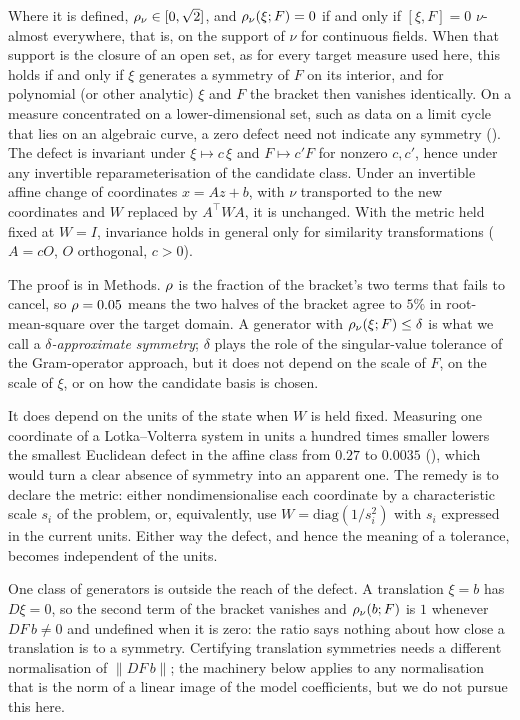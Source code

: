 \begin{lemma}[Properties]
\label{lem:props}
Where it is defined, $\rho_\nu \in [0,\sqrt 2]$, and $\rho_\nu(\xi;F)=0$
if and only if $[\xi,F]=0$ $\nu$-almost everywhere, that is, on the support of
$\nu$ for continuous fields. When that support is the closure of an open set,
as for every target measure used here, this holds if and only if $\xi$
generates a symmetry of $F$ on its interior, and for polynomial (or other
analytic) $\xi$ and $F$ the bracket then vanishes identically. On a measure
concentrated on a lower-dimensional set, such as data on a limit cycle that
lies on an algebraic curve, a zero defect need not indicate any symmetry
(). The defect is invariant under $\xi \mapsto c\,\xi$ and $F \mapsto c'F$ for nonzero $c,c'$,
hence under any invertible reparameterisation of the candidate class. Under an
invertible affine change of coordinates $x = Az + b$, with $\nu$ transported to
the new coordinates and $W$ replaced by $A^{\!\top}WA$, it is unchanged. With
the metric held fixed at $W = I$, invariance holds in general only for
similarity transformations ($A = cO$, $O$ orthogonal, $c > 0$).
\end{lemma}

The proof is in Methods. $\rho$ is the fraction of the bracket's two terms
that fails to cancel, so $\rho = 0.05$ means the two halves of the bracket
agree to $5\%$ in root-mean-square over the target domain. A generator with
$\rho_\nu(\xi;F) \le \delta$ is what we call a \emph{$\delta$-approximate
symmetry}; $\delta$ plays the role of the singular-value tolerance of the
Gram-operator approach, but it does not depend on the scale of $F$, on the scale of $\xi$,
or on how the candidate basis is chosen.

It does depend on the units of the state when $W$ is held fixed. Measuring one
coordinate of a Lotka--Volterra system in units a hundred times smaller lowers
the smallest Euclidean defect in the affine class from $0.27$ to $0.0035$
(\STunits), which would turn a clear absence of symmetry into an
apparent one. The remedy is to declare the metric: either nondimensionalise
each coordinate by a characteristic scale $s_i$ of the problem, or,
equivalently, use $W = \mathrm{diag}(1/s_i^2)$ with $s_i$ expressed in the
current units. Either way the defect, and hence the meaning of a tolerance,
becomes independent of the units.

One class of generators is outside the reach of the defect. A translation
$\xi = b$ has $D\xi = 0$, so the second term of the bracket vanishes and
$\rho_\nu(b;F)$ is $1$ whenever $DF\,b \neq 0$ and undefined when it is
zero: the ratio says nothing about how close a translation is to a symmetry.
Certifying translation symmetries needs a different normalisation of
$\|DF\,b\|$; the machinery below applies to any normalisation that is the norm
of a linear image of the model coefficients, but we do not pursue this here.

